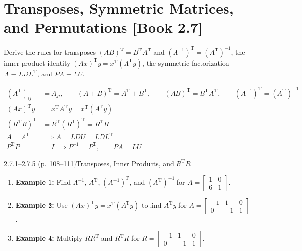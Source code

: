 \documentclass[11pt,a4paper,openany,oneside]{book}
\def\vect#1{#1}%
\def\mathbf#1{#1}%
\def\why#1{}%
\def\bk#1{ [Book #1]}%
\newcommand{\why}[1]{\text{\footnotesize\color{slate}\itshape (#1)}}
\newcommand{\vect}[1]{\mathbf{#1}}
\newcommand{\T}{\mathrm{T}}
\numberwithin{equation}{chapter}
\newcommand{\bk}[1]{\texorpdfstring{\enspace{\normalfont\small\color{slate}[Book #1]}}{ [Book #1]}}
\begin{document}
\section{Transposes, Symmetric Matrices, and Permutations\bk{2.7}}

\begin{goal}
Derive the rules for transposes $(AB)^\T = B^\T A^\T$ and $(A^{-1})^\T = (A^\T)^{-1}$, the inner product identity $(A\vect{x})^\T\vect{y} = \vect{x}^\T(A^\T\vect{y})$, the symmetric factorization $A = LDL^\T$, and $PA = LU$.
\end{goal}

\begin{result}
\begin{align}
(A^\T)_{ij} &= A_{ji}, \qquad (A+B)^\T = A^\T + B^\T, \qquad (AB)^\T = B^\T A^\T, \qquad (A^{-1})^\T = (A^\T)^{-1} \\
(A\vect{x})^\T\vect{y} &= \vect{x}^\T A^\T\vect{y} = \vect{x}^\T(A^\T\vect{y}) &&\why{defining property of $A^\T$} \\
(R^\T R)^\T &= R^\T(R^\T)^\T = R^\T R &&\why{$R^\T R$ and $RR^\T$ are always symmetric} \\
A = A^\T &\implies A = LDU = LDL^\T &&\why{symmetric factorization ($U = L^\T$)} \\
P^\T P &= I \implies P^{-1} = P^\T, \qquad PA = LU &&\why{for any permutation matrix $P$ and invertible $A$}
\end{align}
\end{result}

\begin{example}{2.7.1--2.7.5 (p.\ 108--111)}{Transposes, Inner Products, and $R^\T R$}
\begin{enumerate}
\item \textbf{Example 1:} Find $A^{-1}$, $A^\T$, $(A^{-1})^\T$, and $(A^\T)^{-1}$ for $A = \begin{bmatrix}1 & 0\\6 & 1\end{bmatrix}$.
\item \textbf{Example 2:} Use $(A\vect{x})^\T\vect{y} = \vect{x}^\T(A^\T\vect{y})$ to find $A^\T\vect{y}$ for $A = \begin{bmatrix}-1 & 1 & 0\\0 & -1 & 1\end{bmatrix}$.
\item \textbf{Example 4:} Multiply $RR^\T$ and $R^\T R$ for $R = \begin{bmatrix}-1 & 1 & 0\\0 & -1 & 1\end{bmatrix}$.
\end{enumerate}
\end{example}
\end{document}
